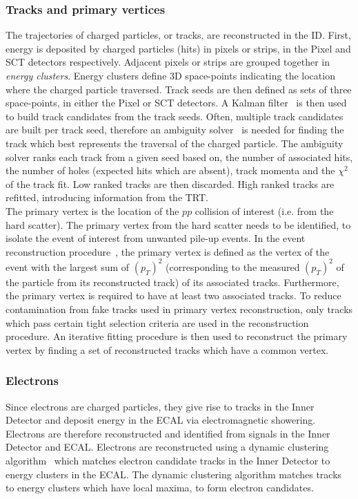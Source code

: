 \subsubsection{Tracks and primary vertices}

The trajectories of charged particles, or tracks, are reconstructed in the ID. First, energy is deposited by charged particles (hits) in pixels or strips, in the Pixel and SCT detectors respectively. Adjacent pixels or strips are grouped together in \textit{energy clusters}. Energy clusters define 3D space-points indicating the location where the charged particle traversed. Track seeds are then defined as sets of three space-points, in either the Pixel or SCT detectors. A Kalman filter~\cite{ASTIER2000138} is then used to build track candidates from the track seeds. Often, multiple track candidates are built per track seed, therefore an ambiguity solver~\cite{Choi:2018mie} is needed for finding the track which best represents the traversal of the charged particle. The ambiguity solver ranks each track from a given seed based on, the number of associated hits, the number of holes (expected hits which are absent), track momenta and the $\chi^{2}$ of the track fit. Low ranked tracks are then discarded. High ranked tracks are refitted, introducing information from the TRT.\\

The primary vertex is the location of the $pp$ collision of interest (i.e. from the hard scatter). The primary vertex from the hard scatter needs to be identified, to isolate the event of interest from unwanted pile-up events. In the event reconstruction procedure~\cite{Meloni_2016}, the primary vertex is defined as the vertex of the event with the largest sum of $(p_{T})^{2}$ (corresponding to the measured $(p_{T})^{2}$ of the particle from its reconstructed track) of its associated tracks. Furthermore, the primary vertex is required to have at least two associated tracks. To reduce contamination from fake tracks used in primary vertex reconstruction, only tracks which pass certain tight selection criteria are used in the reconstruction procedure. An iterative fitting procedure is then used to reconstruct the primary vertex by finding a set of reconstructed tracks which have a common vertex.

\subsubsection{Electrons}
Since electrons are charged particles, they give rise to tracks in the Inner Detector and deposit energy in the ECAL via electromagnetic showering. Electrons are therefore reconstructed and identified from signals in the Inner Detector and ECAL. Electrons are reconstructed using a dynamic clustering algorithm~\cite{electronRecoAndID:paper} which matches electron candidate tracks in the Inner Detector to energy clusters in the ECAL. The dynamic clustering algorithm matches tracks to energy clusters which have local maxima, to form electron candidates.

